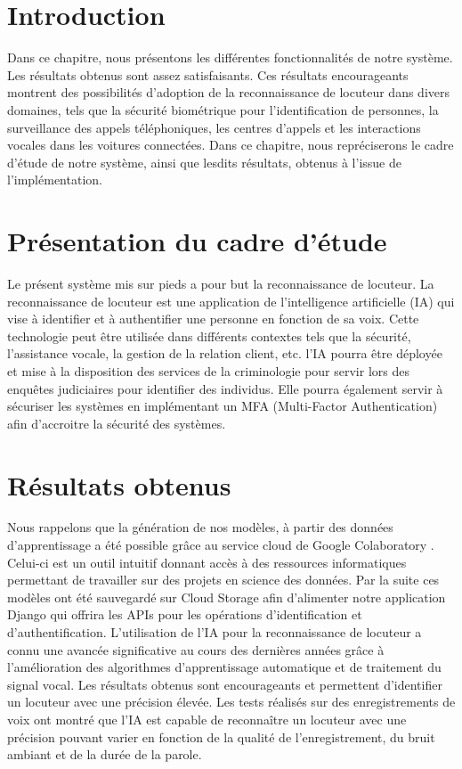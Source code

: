 \section*{Introduction}
Dans ce chapitre, nous présentons les différentes fonctionnalités de notre système.   Les résultats obtenus sont assez satisfaisants. Ces résultats encourageants montrent des possibilités d'adoption de la reconnaissance de locuteur dans divers domaines, tels que la sécurité biométrique pour l'identification de personnes, la surveillance des appels téléphoniques, les centres d'appels et les interactions vocales dans les voitures connectées. Dans ce chapitre, nous repréciserons le cadre d’étude de notre système, ainsi que lesdits résultats, obtenus à l’issue de l’implémentation. 

\section{Présentation du cadre d’étude}
Le présent système mis sur pieds a pour but la reconnaissance de locuteur.
La reconnaissance de locuteur est une application de l'intelligence artificielle (IA) qui vise à identifier et à authentifier une personne en fonction de sa voix. 
Cette technologie peut être utilisée dans différents contextes tels que la sécurité, l'assistance vocale, la gestion de la relation client, etc. 
l’IA pourra être déployée et mise à la disposition des services de la criminologie pour servir lors des enquêtes judiciaires pour identifier des individus. 
Elle pourra également servir à sécuriser les systèmes en implémentant un MFA (Multi-Factor Authentication) afin d’accroitre la sécurité des systèmes.


\section{Résultats obtenus}
Nous rappelons que la génération de nos modèles, à partir des données d’apprentissage a été possible grâce au service cloud de Google Colaboratory . Celui-ci est un outil intuitif donnant accès à des ressources informatiques permettant de travailler sur des projets en science des données. Par la suite ces modèles ont été sauvegardé sur Cloud Storage afin d’alimenter notre application Django qui offrira les APIs pour les opérations d’identification et d’authentification.
L'utilisation de l'IA pour la reconnaissance de locuteur a connu une avancée significative au cours des dernières années grâce à l'amélioration des algorithmes d'apprentissage automatique et de traitement du signal vocal. Les résultats obtenus sont encourageants et permettent d'identifier un locuteur avec une précision élevée.
Les tests réalisés sur des enregistrements de voix ont montré que l'IA est capable de reconnaître un locuteur avec une précision pouvant varier en fonction de la qualité de l'enregistrement, du bruit ambiant et de la durée de la parole. 

